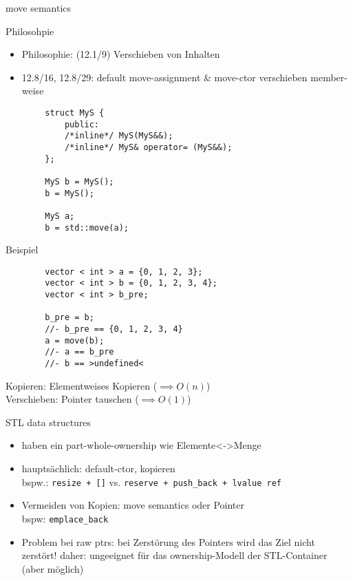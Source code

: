 \begin{frame}[fragile]{move semantics}
	\begin{block}{Philosohpie}
		\begin{itemize}
			\item Philosophie: (12.1/9) Verschieben von Inhalten
			\item 12.8/16, 12.8/29: default move-assignment \& move-ctor verschieben member-weise
		\end{itemize}
	\end{block}
	
	\pause
	
	\begin{lstlisting}
		struct MyS {
			public:
			/*inline*/ MyS(MyS&&);
			/*inline*/ MyS& operator= (MyS&&);
		};
		
		MyS b = MyS();
		b = MyS();
		
		MyS a;
		b = std::move(a);
	\end{lstlisting}
\end{frame}

\begin{frame}[fragile]{Beispiel}
	\begin{lstlisting}
		vector < int > a = {0, 1, 2, 3};
		vector < int > b = {0, 1, 2, 3, 4};
		vector < int > b_pre;
		
		b_pre = b;
		//- b_pre == {0, 1, 2, 3, 4}
		a = move(b);
		//- a == b_pre
		//- b == >undefined<
	\end{lstlisting}
	
	\pause
	
	Kopieren: Elementweises Kopieren ($\implies O(n)$) \\
	Verschieben: Pointer tauschen ($\implies O(1)$)
\end{frame}

\begin{frame}{STL data structures}
	\begin{itemize}
		\item haben ein part-whole-ownership wie Elemente<->Menge
		\item hauptsächlich: default-ctor, kopieren \\
		      bspw.: \texttt{resize + []} vs. \texttt{reserve + push\_back + lvalue ref}
		\item Vermeiden von Kopien: move semantics oder Pointer \\
		      bspw: \texttt{emplace\_back}
		\item Problem bei raw ptrs: bei Zerstörung des Pointers wird das Ziel nicht zerstört!
		      daher: ungeeignet für das ownership-Modell der STL-Container (aber möglich)
	\end{itemize}
\end{frame}


